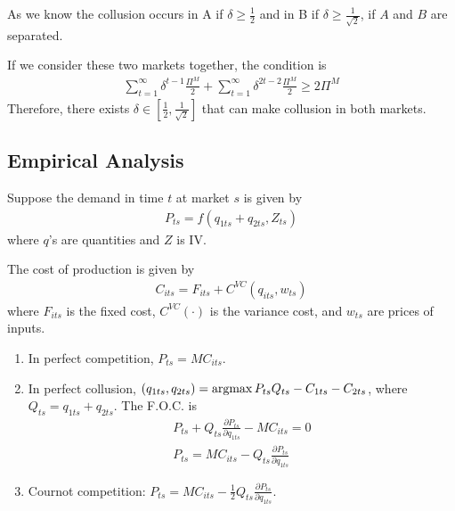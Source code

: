 \documentclass[11pt]{elegantbook}
\newcommand{\argmax}{\operatornamewithlimits{argmax}}
\begin{document}
As we know the collusion occurs in A if $\delta\geq \frac{1}{2}$ and in B if $\delta\geq \frac{1}{\sqrt{2}}$, if $A$ and $B$ are separated.

If we consider these two markets together, the condition is
\begin{equation}
    \begin{aligned}
        \sum_{t=1}^\infty\delta^{t-1}\frac{\Pi^M}{2}+\sum_{t=1}^\infty\delta^{2t-2}\frac{\Pi^M}{2}\geq 2\Pi^M
    \end{aligned}
    \nonumber
\end{equation}
Therefore, there exists $\delta\in \left[\frac{1}{2},\frac{1}{\sqrt{2}}\right]$ that can make collusion in both markets.


\subsection{Empirical Analysis}
Suppose the demand in time $t$ at market $s$ is given by
\begin{equation}
    \begin{aligned}
        P_{ts}=f\left(q_{1ts}+q_{2ts},Z_{ts}\right)
    \end{aligned}
    \nonumber
\end{equation}
where $q$'s are quantities and $Z$ is IV.

The cost of production is given by
\begin{equation}
    \begin{aligned}
        C_{its}=F_{its}+C^{VC}\left(q_{its},w_{ts}\right)
    \end{aligned}
    \nonumber
\end{equation}
where $F_{its}$ is the fixed cost, $C^{VC}(\cdot)$ is the variance cost, and $w_{ts}$ are prices of inputs.
\begin{enumerate}
    \item In perfect competition, $P_{ts}=MC_{its}$.
    \item In perfect collusion, $(q_{1ts},q_{2ts})=\argmax P_{ts}Q_{ts}-C_{1ts}-C_{2ts}$, where $Q_{ts}=q_{1ts}+q_{2ts}$. The F.O.C. is
    \begin{equation}
        \begin{aligned}
            P_{ts}+Q_{ts}\frac{\partial P_{ts}}{\partial q_{1ts}}-MC_{its}=0\\
            P_{ts}=MC_{its}-Q_{ts}\frac{\partial P_{ts}}{\partial q_{1ts}}
        \end{aligned}
        \nonumber
    \end{equation}
    \item Cournot competition: $P_{ts}=MC_{its}-\frac{1}{2}Q_{ts}\frac{\partial P_{ts}}{\partial q_{1ts}}$.
\end{enumerate}
\end{document}
